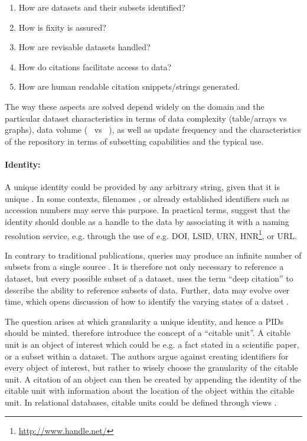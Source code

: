 \documentclass[a4paper,10pt]{article}
\begin{document}
\begin{enumerate}
 \item How are datasets and their subsets identified? 
 \item How is fixity is assured? 
 \item How are revisable datasets handled? 
 \item How do citations facilitate access to data? 
 \item How are human readable citation snippets/strings generated.
\end{enumerate}

The way these aspects are solved depend widely on the domain and the particular dataset characteristics in terms of data complexity (table/arrays vs graphs), data volume (\si{\kilo\byte} vs \si{\peta\byte}), as well as update frequency and the characteristics of the repository in terms of subsetting capabilities and the typical use.

\paragraph{Identity:}
A unique identity could be provided by any arbitrary string, given that it is unique \citep{CODATA2013}. In some contexts, filenames \citep{Buneman2016}, or already established identifiers such as accession numbers \citep{Bandrowski2016} may serve this purpose. 
In practical terms, \cite{AltKin07} suggest that the identity should double as a handle to the data by associating it with a naming resolution service, e.g. through the use of e.g. \gls{DOI},  \gls{LSID}, \gls{URN}, \gls{HNR}\footnote{\url{http://www.handle.net/}}, or \gls{URL}. 

In contrary to traditional publications, queries may produce an infinite number of subsets from a single source \citep{Davidson2017, CODATA2013}. It is therefore not only necessary to reference a dataset, but every possible subset of a dataset. \cite{AltKin07} uses the term ``deep citation'' to describe the ability to reference subsets of data. 
Further, data may evolve over time, which opens discussion of how to identify the varying states of a datset \citep{Huber2015}.

The question arises at which granularity a unique identity, and hence a \glspl{PID} should be minted. \cite{Buneman2010} therefore introduce the concept of a ``citable unit''. A citable unit is an object of interest which could be e.g. a fact stated in a scientific paper, or a subset within a dataset. The authors argue against creating identifiers for every object of interest, but rather to wisely choose the granularity of the citable unit. A citation of an object can then be created by appending the identity of the citable unit with information about the location of the object within the citable unit. In relational databases, citable units could be defined through views \citep{Buneman2016}.
\end{document}
